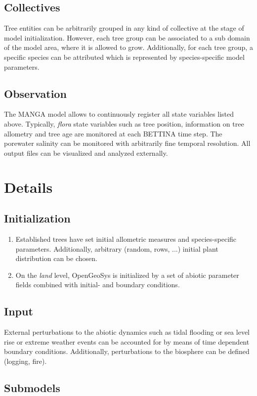 \documentclass[manusscript, 12p, authoryear]{elsarticle}
\begin{document}
\subsection{Collectives}
Tree entities can be arbitrarily grouped in any kind of collective at the stage of model initialization. 
However, each tree group can be associated to a sub domain of the model area, where it is allowed to grow.
Additionally, for each tree group, a specific species can be attributed which is represented by species-specific model parameters.
\subsection{Observation}
The MANGA model allows to continuously register all state variables listed above.
Typically, \textit{flora} state variables such as tree position, information on tree allometry and tree age are monitored at each BETTINA time step.
The porewater salinity can be monitored with arbitrarily fine temporal resolution.
All output files can be visualized and analyzed externally.


\section{Details}
\subsection{Initialization}
\begin{enumerate}
\item Established trees have set initial allometric measures and species-specific parameters.
Additionally, arbitrary (random, rows, ...) initial plant distribution can be chosen.
\item On the \textit{land} level, OpenGeoSys is initialized by a set of abiotic parameter fields combined with initial- and boundary conditions.
\end{enumerate}
\subsection{Input}
External perturbations to the abiotic dynamics such as tidal flooding or sea level rise or extreme weather events can be accounted for by means of time dependent boundary conditions.
Additionally, perturbations to the biosphere can be defined (logging, fire). 
\subsection{Submodels}
\end{document}
